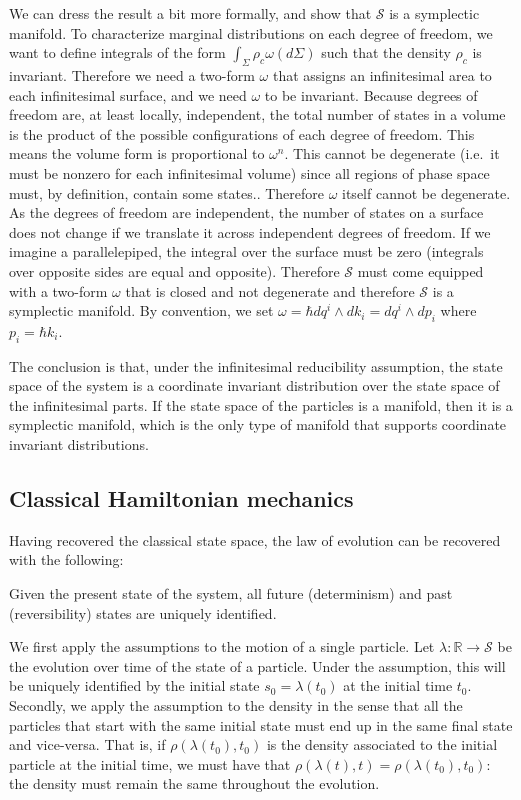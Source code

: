\documentclass[11pt,letterpaper,fleqn]{memoir} %
\begin{document}
We can dress the result a bit more formally, and show that $\mathcal{S}$ is a symplectic manifold. To characterize marginal distributions on each degree of freedom, we want to define integrals of the form $\int_{\Sigma} \rho_c \omega(d\Sigma)$ such that the density $\rho_c$ is invariant. Therefore we need a two-form $\omega$ that assigns an infinitesimal area to each infinitesimal surface, and we need $\omega$ to be invariant. Because degrees of freedom are, at least locally, independent, the total number of states in a volume is the product of the possible configurations of each degree of freedom. This means the volume form is proportional to $\omega^n$. This cannot be degenerate (i.e.~it must be nonzero for each infinitesimal volume) since all regions of phase space must, by definition, contain some states.. Therefore $\omega$ itself cannot be degenerate. As the degrees of freedom are independent, the number of states on a surface does not change if we translate it across independent degrees of freedom. If we imagine a parallelepiped, the integral over the surface must be zero (integrals over opposite sides are equal and opposite). Therefore $\mathcal{S}$ must come equipped with a two-form $\omega$ that is closed and not degenerate and therefore $\mathcal{S}$ is a symplectic manifold. By convention, we set $\omega = \hbar dq^i \wedge dk_i = dq^i \wedge dp_i$ where $p_i = \hbar k_i$.

The conclusion is that, under the infinitesimal reducibility assumption, the state space of the system is a coordinate invariant distribution over the state space of the infinitesimal parts. If the state space of the particles is a manifold, then it is a symplectic manifold, which is the only type of manifold that supports coordinate invariant distributions.

\subsection{Classical Hamiltonian mechanics}

Having recovered the classical state space, the law of evolution can be recovered with the following:
\begin{assump}\label{assump_detrev}
	Given the present state of the system, all future (determinism) and past (reversibility) states are uniquely identified.
\end{assump}

We first apply the assumptions to the motion of a single particle. Let $\lambda : \mathbb{R} \to \mathcal{S}$ be the evolution over time of the state of a particle. Under the assumption, this will be uniquely identified by the initial state $s_0 = \lambda(t_0)$ at the initial time $t_0$. Secondly, we apply the assumption to the density in the sense that all the particles that start with the same initial state must end up in the same final state and vice-versa. That is, if $\rho(\lambda(t_0), t_0)$ is the density associated to the initial particle at the initial time, we must have that $\rho(\lambda(t), t) = \rho(\lambda(t_0), t_0)$: the density must remain the same throughout the evolution.
\end{document}
